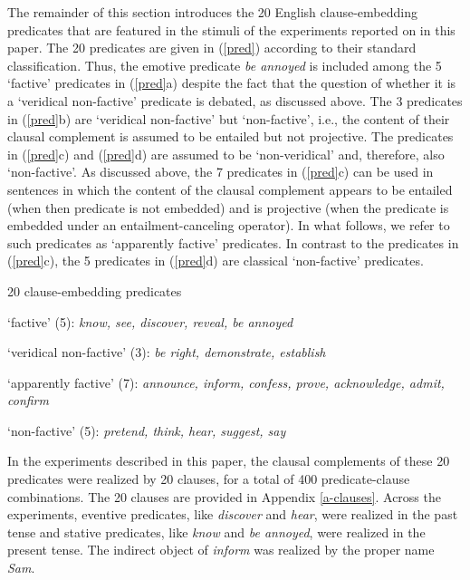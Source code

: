\documentclass[11pt,fleqn]{article}
\newcommand{\6}{\mbox{$[\hspace*{-.6mm}[$}}
\newcommand{\9}{\mbox{$]\hspace*{-.6mm}]$}}
\begin{document}
The remainder of this section introduces the 20 English clause-embedding predicates that are featured in the stimuli of the experiments reported on in this paper. The 20 predicates are given in (\ref{pred}) according to their standard classification. Thus, the emotive predicate {\em be annoyed} is included among the 5  `factive' predicates in (\ref{pred}a) despite the fact that the question of whether it is a `veridical non-factive' predicate is debated, as discussed above. The 3 predicates in (\ref{pred}b) are `veridical non-factive' but `non-factive', i.e., the content of their clausal complement is assumed to be entailed but not projective. The predicates in (\ref{pred}c) and (\ref{pred}d) are assumed to be `non-veridical' and, therefore, also `non-factive'. As discussed above, the 7 predicates in (\ref{pred}c) can be used in sentences in which the content of the clausal complement appears to be entailed (when then predicate is not embedded) and is projective (when the predicate is embedded under an entailment-canceling operator). In what follows, we refer to such predicates as `apparently factive' predicates. In contrast to the predicates in (\ref{pred}c), the 5 predicates in (\ref{pred}d) are classical `non-factive' predicates.

\begin{exe}
\ex\label{pred} 20 clause-embedding predicates 

\begin{xlist}

\ex `factive' (5): {\em know, see, discover, reveal, be annoyed}

\ex `veridical non-factive' (3): {\em be right, demonstrate, establish}

\ex `apparently factive' (7): {\em announce, inform, confess, prove, acknowledge, admit, confirm}

\ex `non-factive' (5): {\em pretend, think, hear, suggest, say}

\end{xlist}

\end{exe}
In the experiments described in this paper, the clausal complements of these 20 predicates were realized by 20 clauses, for a total of 400 predicate-clause combinations. The 20 clauses are provided in Appendix \ref{a-clauses}. Across the experiments, eventive predicates, like {\em discover} and {\em hear}, were realized in the past tense and stative predicates, like {\em know} and {\em be annoyed}, were realized in the present tense. The indirect object of {\em inform} was realized by the proper name {\em Sam}.
\end{document}
